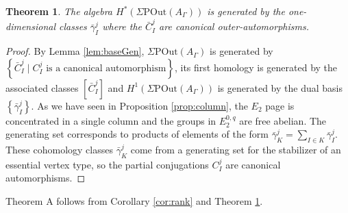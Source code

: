 \documentclass[a4paper]{amsart}
\newcommand{\G}{\Gamma}
\newcommand{\POut}{\Sigma\mathrm{POut}}
\newtheorem{teo}{Theorem}[section]
\theoremstyle{definition}
\theoremstyle{remark}
\begin{document}
\begin{teo}
    The algebra $H^*(\POut(A_\G))$ is generated by the one-dimensional classes $\bar{\gamma}_I^j$ where  the $\bar{C}_{I}^j$ are canonical outer-automorphisms. \label{teo:oneDimPSO}

\end{teo}
\begin{proof}
   

By Lemma \ref{lem:baseGen},  $\POut(A_\G)$ is generated by $\left\{\bar{C}_{I}^j \mid C_{I}^j  \text{ is a canonical automorphism} \right\}$, its first homology is generated by the associated classes $\left[\bar{C}_{I}^j\right]$ and $H^1\left(\POut(A_\G)\right)$ is generated by the dual basis $\left\{\bar{\gamma}_I^j\right\}$. As we have seen in Proposition \ref{prop:column}, the $E_2$ page is concentrated in a single column and the groups in $E_2^{0, q}$ are free abelian.  The  generating set corresponds to products of elements of the form  $\bar{\gamma}_{K}^j=\sum_{I \in K} \bar{\gamma}_{I}^j$. These cohomology classes $\bar{\gamma}_{K}^j$ come from a generating set for the stabilizer of an essential vertex type, so  the partial conjugations $C_{I}^j$ are canonical automorphisms.
\end{proof}

Theorem A follows from Corollary \ref{cor:rank} and Theorem \ref{teo:oneDimPSO}.
\end{document}
